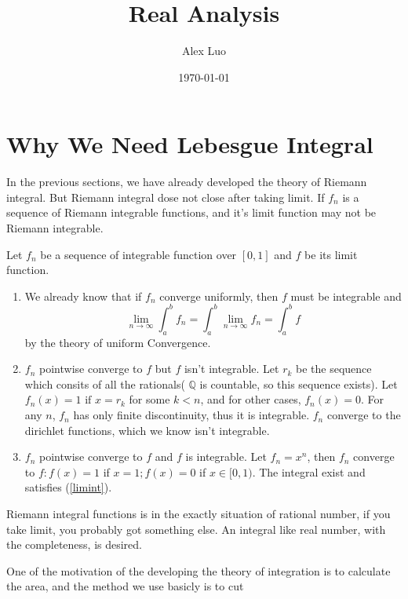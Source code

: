 \documentclass[lang=en, 12pt]{elegantbook}
\title{{\Huge{\textbf{Real Analysis}}}}
\author{Alex Luo}
\date{\today}
\begin{document}
\frontmatter
\maketitle
\tableofcontents

\mainmatter
    \chapter{Why We Need Lebesgue Integral}
        In the previous sections, we have already developed the theory of Riemann integral. But Riemann integral dose not 
    close after taking limit. If ${f_n}$ is a sequence of Riemann integrable functions, and it's limit function may not be Riemann integrable.   
    \begin{example}
        Let ${f_n}$ be a sequence of integrable function over $[0,1]$ and $f$ be its limit function. 
    \begin{enumerate}
        \item We already know that if $f_n$ converge uniformly, then $f$ must be integrable and 
        \begin{equation}
        \lim_{n \to \infty} \int_a^b f_n = \int_a^b \lim_{n \to \infty}f_n = \int_a^b f \label{limint}
        \end{equation}
        by the theory of uniform Convergence.
        \item ${f_n}$ pointwise converge to $f$ but $f$ isn't integrable.
        Let ${r_k}$ be the sequence which consits of all the rationals( $\mathbb{Q}$ is countable, so this sequence exists).
        Let $f_n(x) = 1 \mbox{ if } x = r_k $ for some $k < n$, and for other cases, $f_n(x) = 0$. For any $n$, $f_n$ has only 
        finite discontinuity, thus it is integrable. ${f_n}$ converge to the dirichlet functions, which we know isn't integrable.
        \item ${f_n}$ pointwise converge to $f$ and $f$ is integrable. Let $f_n = x^n$, then ${f_n}$ converge to 
        $f: f(x)= 1 $ if $ x = 1 ; f(x) = 0 $ if $ x \in [0,1)$. The integral exist and satisfies (\ref*{limint}).
    \end{enumerate} 
    \end{example} \par
        Riemann integral functions is in the exactly situation of rational number, if you take limit, you probably got something
    else. An integral like real number, with the completeness,  is desired.
    \par
        One of the motivation of the developing the theory of integration is to calculate the area, and the method we use basicly is to cut
\end{document}
